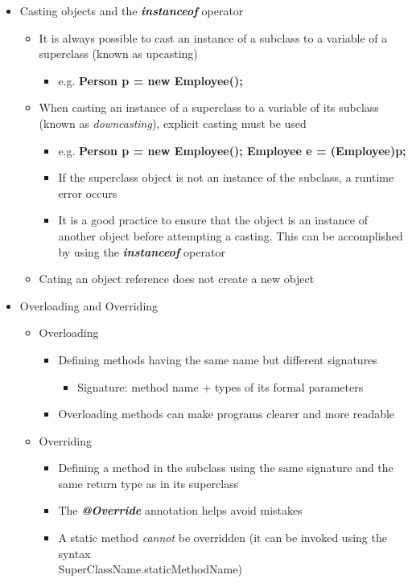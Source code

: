 \documentclass[11pt]{article}
\begin{document}
\begin{itemize}
	\item Casting objects and the \textit{\textbf{instanceof}} operator
		\begin{itemize}
			\item It is always possible to cast an instance of a subclass to a variable of a superclass (known as upcasting)
				\begin{itemize}
					\item e.g. \textbf{Person p = new Employee();}
				\end{itemize}
			\item When casting an instance of a superclass to a variable of its subclass (known as \textit{downcasting}), explicit casting must be used
				\begin{itemize}
					\item e.g. \textbf{Person p = new Employee(); Employee e = (Employee)p;}
					\item If the superclass object is not an instance of the subclass, a runtime error occurs
					\item  It is a good practice to ensure that the object is an instance of another object before attempting a casting. This can be accomplished by using the \textit{\textbf{instanceof}} operator
				\end{itemize}
			\item Cating an object reference does not create a new object
		\end{itemize}

	\item Overloading and Overriding
		\begin{itemize}
			\item Overloading
				\begin{itemize}
					\item Defining methods having the same name but different signatures
						\begin{itemize}
							\item Signature: method name + types of its formal parameters
						\end{itemize}
					\item Overloading methods can make programs clearer and more readable
				\end{itemize}
			\item Overriding
				\begin{itemize}
					\item Defining a method in the subclass using the same signature and the same
					return type as in its superclass
					\item The \textbf{\textit{@Override}} annotation helps avoid mistakes
					\item A static method \textit{cannot} be overridden (it can be invoked using the syntax\\
					 SuperClassName.staticMethodName)
				\end{itemize}
		\end{itemize}


\end{itemize}
\end{document}
